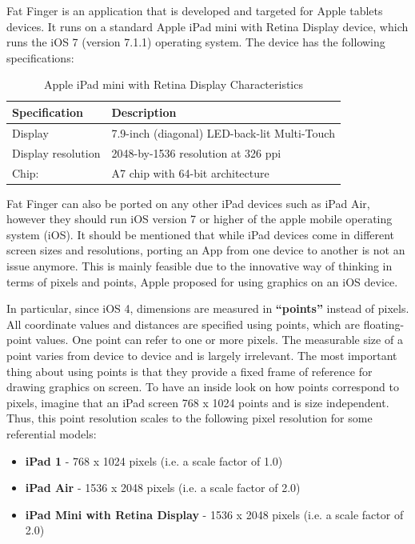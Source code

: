 
Fat Finger is an application that is developed and targeted for Apple tablets devices. It runs on a standard Apple iPad mini with Retina Display device, which runs the iOS 7 (version 7.1.1) operating system. The device has the following specifications:


\begin{table}[H]
\centering
\begin{tabular}{l || l }
Specification & Description \\
\hline
Display & 7.9-inch (diagonal) LED-back-lit Multi-Touch \\
Display resolution & 2048-by-1536 resolution at 326 ppi
\\
Chip: & A7 chip with 64-bit architecture
\end{tabular}
\caption{Apple iPad mini with Retina Display Characteristics}
\label{tab:ipadspecs}
\end{table}


Fat Finger can also be ported on any other iPad devices such as iPad Air, however they should run iOS version 7 or higher of the apple mobile operating system (iOS). It should be mentioned that while iPad devices come in different screen sizes and resolutions, porting an App from one device to another is not an issue anymore. This is mainly feasible due to the innovative way of thinking in terms of pixels and points, Apple proposed for using graphics on an iOS device. 


In particular, since iOS 4, dimensions are measured in \textbf{“points”} instead of pixels. All coordinate values and distances are specified using points, which are floating-point values. One point can refer to one or more pixels. The measurable size of a point varies from device to device and is largely irrelevant. The most important thing about using points is that they provide a fixed frame of reference for drawing graphics on screen. To have an inside look on how points correspond to pixels, imagine that an iPad screen 768 x 1024 points and is size independent. Thus, this point resolution scales to the following pixel resolution for some referential models:


\begin{itemize}
    \item \textbf{iPad 1} - 768 x 1024 pixels (i.e. a scale factor of 1.0)
    \item \textbf{iPad Air} - 1536 x 2048 pixels (i.e. a scale factor of 2.0)
    \item \textbf{iPad Mini  with Retina Display} - 1536 x 2048 pixels (i.e. a scale factor of 2.0)
 \end{itemize}


